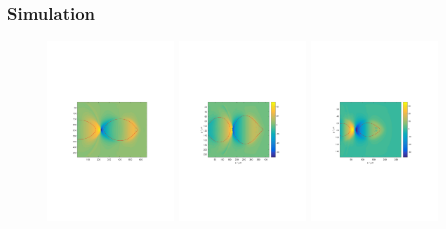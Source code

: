 \subsubsection{Simulation}
\cite{Manahan_HotSpots_PRAB}
\begin{figure}
\includegraphics[width=0.3\textwidth]{simulations/images/raw/DC_lp_333mu.pdf}
\includegraphics[width=0.3\textwidth]{simulations/images/raw/DC_lp_149mu.pdf}
\includegraphics[width=0.3\textwidth]{simulations/images/raw/DC_Q_1nC.pdf}
\end{figure}

